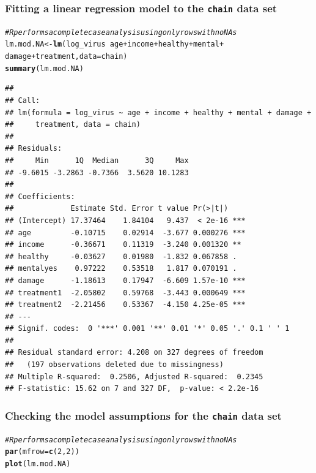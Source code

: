 \documentclass{beamer}\usepackage[]{graphicx}\usepackage[]{color}
\makeatletter
\newcommand{\hlnum}[1]{\textcolor[rgb]{0.686,0.059,0.569}{#1}}%
\newcommand{\hlcom}[1]{\textcolor[rgb]{0.678,0.584,0.686}{\textit{#1}}}%
\newcommand{\hlopt}[1]{\textcolor[rgb]{0,0,0}{#1}}%
\newcommand{\hlstd}[1]{\textcolor[rgb]{0.345,0.345,0.345}{#1}}%
\newcommand{\hlkwb}[1]{\textcolor[rgb]{0.69,0.353,0.396}{#1}}%
\newcommand{\hlkwc}[1]{\textcolor[rgb]{0.333,0.667,0.333}{#1}}%
\newcommand{\hlkwd}[1]{\textcolor[rgb]{0.737,0.353,0.396}{\textbf{#1}}}%
\newenvironment{kframe}{%
 \def\at@end@of@kframe{}%
 \ifinner\ifhmode%
  \def\at@end@of@kframe{\end{minipage}}%
  \begin{minipage}{\columnwidth}%
 \fi\fi%
 \def\FrameCommand##1{\hskip\@totalleftmargin \hskip-\fboxsep
 \colorbox{shadecolor}{##1}\hskip-\fboxsep
     \hskip-\linewidth \hskip-\@totalleftmargin \hskip\columnwidth}%
 \MakeFramed {\advance\hsize-\width
   \@totalleftmargin\z@ \linewidth\hsize
   \@setminipage}}%
 {\par\unskip\endMakeFramed%
 \at@end@of@kframe}
\newenvironment{knitrout}{}{} %
\makeatother
\begin{document}
{{{
\begin{frame}[fragile]
\frametitle{Fitting a linear regression model to the \texttt{chain} data set}
\begin{knitrout}\tiny
{}\color{fgcolor}\begin{kframe}
\begin{alltt}
\hlcom{# R performs a complete case analysis using only rows with no NAs}
\hlstd{lm.mod.NA} \hlkwb{<-} \hlkwd{lm}\hlstd{(log_virus} \hlopt{~} \hlstd{age} \hlopt{+} \hlstd{income} \hlopt{+} \hlstd{healthy} \hlopt{+} \hlstd{mental} \hlopt{+}
                   \hlstd{damage} \hlopt{+} \hlstd{treatment,} \hlkwc{data} \hlstd{= chain)}
\hlkwd{summary}\hlstd{(lm.mod.NA)}
\end{alltt}
\begin{verbatim}
## 
## Call:
## lm(formula = log_virus ~ age + income + healthy + mental + damage + 
##     treatment, data = chain)
## 
## Residuals:
##     Min      1Q  Median      3Q     Max 
## -9.6015 -3.2863 -0.7366  3.5620 10.1283 
## 
## Coefficients:
##             Estimate Std. Error t value Pr(>|t|)    
## (Intercept) 17.37464    1.84104   9.437  < 2e-16 ***
## age         -0.10715    0.02914  -3.677 0.000276 ***
## income      -0.36671    0.11319  -3.240 0.001320 ** 
## healthy     -0.03627    0.01980  -1.832 0.067858 .  
## mentalyes    0.97222    0.53518   1.817 0.070191 .  
## damage      -1.18613    0.17947  -6.609 1.57e-10 ***
## treatment1  -2.05802    0.59768  -3.443 0.000649 ***
## treatment2  -2.21456    0.53367  -4.150 4.25e-05 ***
## ---
## Signif. codes:  0 '***' 0.001 '**' 0.01 '*' 0.05 '.' 0.1 ' ' 1
## 
## Residual standard error: 4.208 on 327 degrees of freedom
##   (197 observations deleted due to missingness)
## Multiple R-squared:  0.2506,	Adjusted R-squared:  0.2345 
## F-statistic: 15.62 on 7 and 327 DF,  p-value: < 2.2e-16
\end{verbatim}
\end{kframe}
\end{knitrout}
\end{frame}

\begin{frame}[fragile]
\frametitle{Checking the model assumptions for the \texttt{chain} data set}
\begin{knitrout}\tiny
{}\color{fgcolor}\begin{kframe}
\begin{alltt}
\hlcom{# R performs a complete case analysis using only rows with no NAs}
\hlkwd{par}\hlstd{(}\hlkwc{mfrow}\hlstd{=}\hlkwd{c}\hlstd{(}\hlnum{2}\hlstd{,}\hlnum{2}\hlstd{))}
\hlkwd{plot}\hlstd{(lm.mod.NA)}
\end{alltt}
\end{kframe}


\end{knitrout}
\end{frame}}}}
\end{document}
